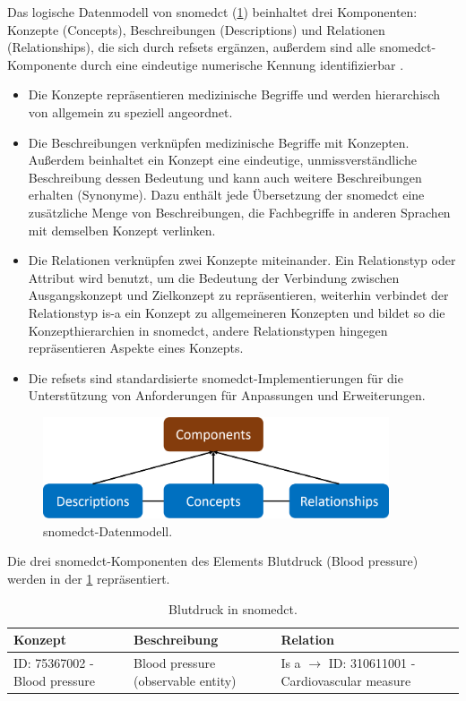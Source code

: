 Das logische Datenmodell von \ac{snomedct} (\ref{fig:snomedmodel}) beinhaltet drei Komponenten: Konzepte (Concepts), Beschreibungen (Descriptions) und Relationen (Relationships), die sich durch \ac{refsets} ergänzen, außerdem sind alle \ac{snomedct}-Komponente durch eine eindeutige numerische Kennung identifizierbar \cite{snomedguide}. 
\begin{itemize}
	\item Die Konzepte repräsentieren medizinische Begriffe und werden hierarchisch von allgemein zu speziell angeordnet.
	\item Die Beschreibungen verknüpfen medizinische Begriffe mit Konzepten. Außerdem beinhaltet ein Konzept eine eindeutige, unmissverständliche Beschreibung dessen Bedeutung und kann auch weitere Beschreibungen erhalten (Synonyme). Dazu enthält jede Übersetzung der \ac{snomedct} eine zusätzliche Menge von Beschreibungen, die Fachbegriffe in anderen Sprachen mit demselben Konzept verlinken.
	\item Die Relationen verknüpfen zwei Konzepte miteinander. Ein Relationstyp oder Attribut wird benutzt, um die Bedeutung der Verbindung zwischen Ausgangskonzept und Zielkonzept zu repräsentieren, weiterhin verbindet der Relationstyp \glqq is-a\grqq{} ein Konzept zu allgemeineren Konzepten und bildet so die Konzepthierarchien in \ac{snomedct}, andere Relationstypen hingegen repräsentieren Aspekte eines Konzepts.
	\item Die \ac{refsets} sind standardisierte \ac{snomedct}-Implementierungen für die Unterstützung von Anforderungen für Anpassungen und Erweiterungen.
\end{itemize}

\begin{figure}[ht]
	\centering
	\includegraphics[height=3cm]{figures/snomedmodel}
	\caption[\acs{snomedct}-Datenmodell]{\acs{snomedct}-Datenmodell.}
	\label{fig:snomedmodel}
\end{figure}

Die drei \ac{snomedct}-Komponenten des Elements Blutdruck (Blood pressure) werden in der \ref{tab:snomedexample} repräsentiert.

\begin{table}[ht]
	\centering 
	\small 
	\caption[Blutdruck in \acs{snomedct}]{Blutdruck in \acs{snomedct}.}
	\label{tab:snomedexample}
	\begin{tabular}{|p{2.5cm}|p{3.2cm}|p{5.3cm}|}
		\hline
		\rowcolor{lightgray} Konzept & Beschreibung & Relation \\ \hline
		ID: 75367002 - Blood pressure & Blood pressure (observable entity) &  Is a  $\to$  ID: 310611001 - Cardiovascular measure \\ \hline		    
	\end{tabular}
\end{table}

